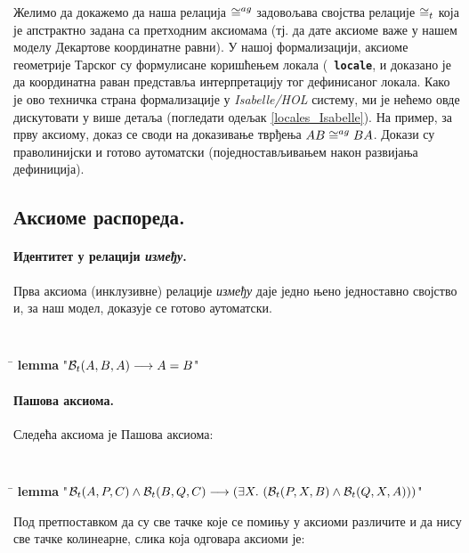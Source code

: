 Желимо да докажемо да наша релација $ \cong^{ag} $ задовољава
својства релације $ \cong_t $ која је апстрактно задана са
претходним аксиомама (тј. да дате аксиоме важе у нашем моделу
Декартове координатне равни). У нашој формализацији, аксиоме
геометрије Тарског су формулисане коришћењем локала ({\tt
  \textbf{locale}}, и доказано је да координатна раван представља
интерпретацију тог дефинисаног локала. Како је ово техничка страна
формализације у \emph{Isabelle/HOL} систему, ми је нећемо овде
дискутовати у више детаља (погледати одељак \ref{locales_Isabelle}).
На пример, за прву аксиому, доказ се своди на доказивање тврђења
\mbox{$AB \cong^{ag} BA$}. Докази су праволинијски и готово
аутоматски (поједностављивањем након развијања дефиниција).

\subsection{Аксиоме распореда.}


\paragraph{Идентитет у релацији \emph{између}.}

Прва аксиома (инклузивне) релације \emph{између} даје једно њено
једноставно својство и, за наш модел, доказује се готово аутоматски.
 {\tt
\begin{tabbing}
\hspace{5mm}\=\kill
\textbf{lemma} "$\mathcal{B}_t(A, B, A) \longrightarrow A = B$"
\end{tabbing}
}

\paragraph{Пашова аксиома.}

Следећа аксиома је Пашова аксиома:
{\tt
\begin{tabbing}
\hspace{5mm}\=\kill
\textbf{lemma} "$\mathcal{B}_t(A, P, C) \wedge \mathcal{B}_t(B, Q, C) \longrightarrow (\exists X.\ (\mathcal{B}_t(P, X, B) \wedge \mathcal{B}_t(Q, X, A)))$"
\end{tabbing}
}

Под претпоставком да су све тачке које се помињу у аксиоми различите и
да нису све тачке колинеарне, слика која одговара аксиоми је:
\begin{center}

\end{center}


